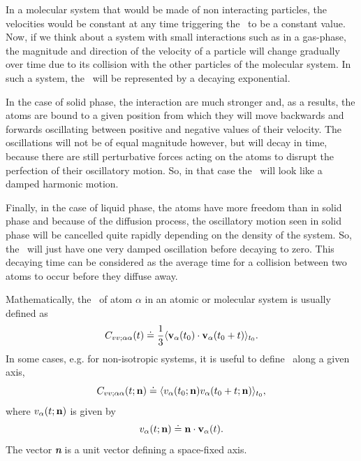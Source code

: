 \documentclass[a4paper,11pt]{report}
\begin{document}
In a molecular system that would be made of non interacting particles, the velocities would be constant at 
any time triggering the \VACF\ to be a constant value. Now, if we think about a system with small interactions such as in a
gas-phase, the magnitude and direction of the velocity of a particle will change gradually over time due to its 
collision with the other particles of the molecular system. In such a system, the \VACF\ will be represented by a
decaying exponential.

In the case of solid phase, the interaction are much stronger and, as a results, the atoms are bound to a given 
position from which they will move backwards and forwards oscillating between positive and negative values of 
their velocity. The oscillations will not be of equal magnitude however, but will decay in time, because there 
are still perturbative forces acting on the atoms to disrupt the perfection of their oscillatory motion. So, in 
that case the \VACF\ will look like a damped harmonic motion.

Finally, in the case of liquid phase, the atoms have more freedom than in solid phase and because of the diffusion 
process, the oscillatory motion seen in solid phase will be cancelled quite rapidly depending on the density of the
system. So, the \VACF\ will just have one very damped oscillation before decaying to zero. This decaying time can be
considered as the average time for a collision between two atoms to occur before they diffuse away.

Mathematically, the \VACF\ of atom $\alpha$ in an atomic or molecular system is usually defined as
\begin{equation}
\label{eq:vacf}
C_{vv ; \alpha\alpha}(t) \doteq
\frac{1}{3}\langle {\bf v}_\alpha(t_0)\cdot{\bf v}_\alpha(t_0+t)\rangle_{t_0}.
\end{equation}
In some cases, e.g. for non-isotropic systems, it is useful to define \VACF\ along a given axis,
\begin{equation}
\label{eq:vacf_n}
C_{vv ; \alpha\alpha}(t;{\bf n}) \doteq
\langle v_\alpha(t_0;{\bf n})v_\alpha(t_0+t;{\bf n})\rangle_{t_0},
\end{equation}
where $v_\alpha(t;{\bf n})$ is given by
\begin{equation}
v_\alpha(t;{\bf n}) \doteq 
{\bf n}\cdot{\bf v}_{\alpha}(t).
\end{equation}
The vector \textit{\textbf{n}} is a unit vector defining a space-fixed axis.
\end{document}
